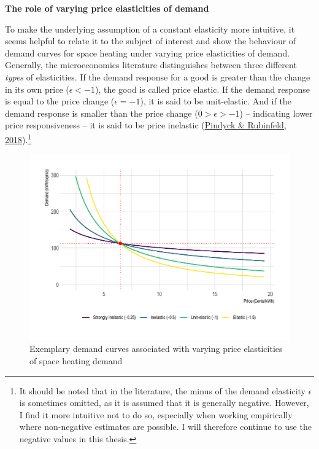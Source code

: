 \documentclass[12pt,twoside]{reedthesis}
\begin{document}
\textbf{The role of varying price elasticities of demand}

To make the underlying assumption of a constant elasticity more intuitive, it seems helpful to relate it to the subject of interest and show the behaviour of demand curves for space heating under varying price elasticities of demand. Generally, the microeconomics literature distinguishes between three different \emph{types} of elasticities. If the demand response for a good is greater than the change in its own price (\(\epsilon < -1\)), the good is called price elastic. If the demand response is equal to the price change (\(\epsilon = -1\)), it is said to be unit-elastic. And if the demand response is smaller than the price change (\(0 > \epsilon > -1\)) -- indicating lower price responsiveness -- it is said to be price inelastic (\protect\hyperlink{ref-pindyck_rubinfeld18}{Pindyck \& Rubinfeld, 2018}).\footnote{It should be noted that in the literature, the minus of the demand elasticity \(\epsilon\) is sometimes omitted, as it is assumed that it is generally negative. However, I find it more intuitive not to do so, especially when working empirically where non-negative estimates are possible. I will therefore continue to use the negative values in this thesis.}
\begin{figure}

{\centering \includegraphics[width=1\linewidth]{figure/elasticities_plot} 

}

\caption{Exemplary demand curves associated with varying price elasticities of space heating demand}\label{fig:elasticities-conceptual}
\end{figure}
\end{document}
